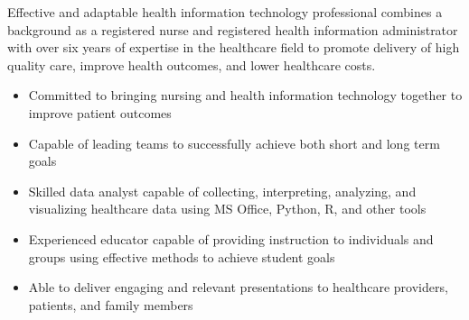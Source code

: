 

\begin{cvparagraph}

Effective and adaptable health information technology professional combines a background as a registered nurse and registered health information administrator with over six years of expertise in the healthcare field to promote delivery of high quality care, improve health outcomes, and lower healthcare costs.
    \begin{itemize}[topsep=0pt,itemsep=0pt,parsep=0pt,partopsep=0pt,leftmargin=4mm]
      \item Committed to bringing nursing and health information technology together to improve patient outcomes    
      \item Capable of leading teams to successfully achieve both short and long term goals
      \item Skilled data analyst capable of collecting, interpreting, analyzing, and visualizing healthcare data using MS Office, Python, R, and other tools
      \item Experienced educator capable of providing instruction to individuals and groups using effective methods to achieve student goals  
      \item Able to deliver engaging and relevant presentations to healthcare providers, patients, and family members
    \end{itemize}
\end{cvparagraph}
